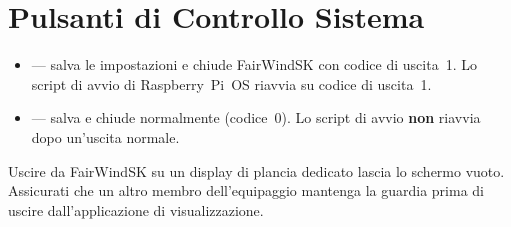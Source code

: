\section{Pulsanti di Controllo Sistema}

\begin{itemize}
  \item {} --- salva le impostazioni e chiude FairWindSK con codice
        di uscita~1. Lo script di avvio di Raspberry~Pi~OS riavvia su codice di uscita~1.
  \item {} --- salva e chiude normalmente (codice~0).
        Lo script di avvio \textbf{non} riavvia dopo un'uscita normale.
\end{itemize}

\begin{warningbox}
Uscire da FairWindSK su un display di plancia dedicato lascia lo schermo vuoto.
Assicurati che un altro membro dell'equipaggio mantenga la guardia prima di uscire
dall'applicazione di visualizzazione.
\end{warningbox}
